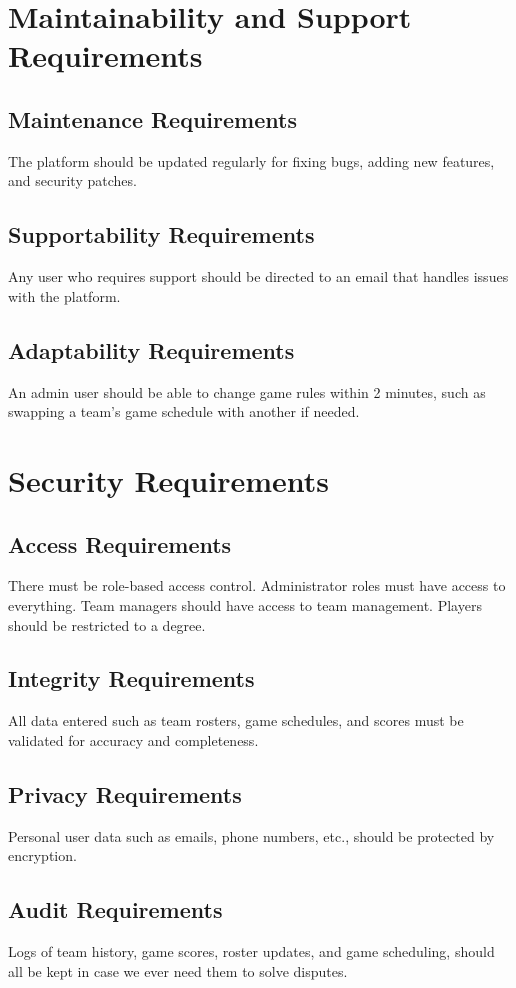 \documentclass[12pt]{article}
\begin{document}
\section{Maintainability and Support Requirements}
\subsection{Maintenance Requirements}
The platform should be updated regularly for fixing bugs, adding new features, and security patches.

\subsection{Supportability Requirements}
Any user who requires support should be directed to an email that handles issues with the platform.

\subsection{Adaptability Requirements}
An admin user should be able to change game rules within 2 minutes, such as swapping a team’s game schedule with another if needed.

\section{Security Requirements}
\subsection{Access Requirements}
There must be role-based access control. Administrator roles must have access to everything. Team managers should have access to team management. Players should be restricted to a degree.

\subsection{Integrity Requirements}
All data entered such as team rosters, game schedules, and scores must be validated for accuracy and completeness.

\subsection{Privacy Requirements}
Personal user data such as emails, phone numbers, etc., should be protected by encryption.

\subsection{Audit Requirements}
Logs of team history, game scores, roster updates, and game scheduling, should all be kept in case we ever need them to solve disputes.
\end{document}
